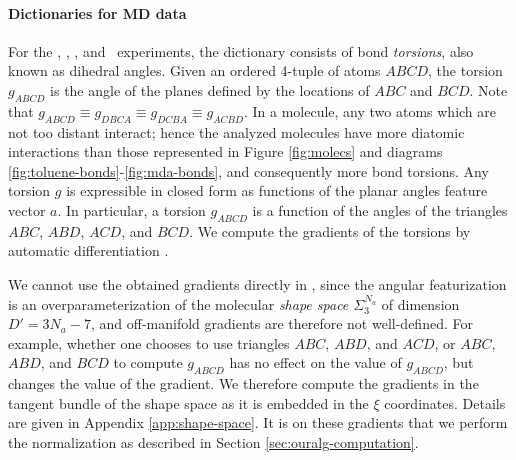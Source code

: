 {\paragraph{Dictionaries for MD data}

For the \redata, \ethdata, \maldata, and \toldata~experiments, the dictionary consists of bond {\em torsions}, also known as dihedral angles. Given an ordered
4-tuple of atoms $ABCD$, the torsion $g_{ABCD}$ is the
angle of the planes defined by the locations of $ABC$ and $BCD$. Note that $g_{ABCD}\equiv g_{DBCA}\equiv g_{DCBA}\equiv g_{ACBD}$. In a molecule, any two
atoms which are not too distant interact; hence the analyzed molecules have more diatomic interactions than those represented in Figure \ref{fig:molecs} and  diagrams \ref{fig:toluene-bonds}-\ref{fig:mda-bonds}, and consequently more bond torsions.
Any torsion $g$ is expressible in closed form as functions of the
planar angles feature vector $a$. In particular, a torsion $g_{ABCD}$
is a function of the angles of the triangles $ABC$, $ABD$, $ACD$, and
$BCD$.  We compute the gradients of the torsions by automatic
differentiation \citep{paszke2017automatic}.

We cannot use the obtained gradients directly in \ouralg, since the angular featurization is an overparameterization of the molecular {\em shape space
$\Sigma_3^{N_a}$} \citep{addicoatcollins:2010,Kendall1989-hu} of
dimension $D'=3N_a-7$, and off-manifold gradients are therefore not well-defined.
For
example, whether one chooses to use triangles $ABC$, $ABD$, and $ACD$,
or $ABC$, $ABD$, and $BCD$ to compute $g_{ABCD}$ has no effect on the value of $g_{ABCD}$, but changes the value of the gradient.
We therefore compute the gradients in the tangent bundle of the shape space as it is embedded in the $\xi$ coordinates. Details are given in Appendix \ref{app:shape-space}. It is on these gradients that we perform the normalization as described in Section \ref{sec:ouralg-computation}.

}
